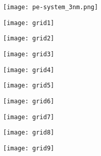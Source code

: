 \begin{figure}[!ht] 
	\centering
	\begin{subfigure}{\textwidth} \centering \texttt{[image: pe-system\_3nm.png]}
	\end{subfigure}%
	\vfill
	\begin{subfigure}{0.33\textwidth} \texttt{[image: grid1]} \end{subfigure}%
	\begin{subfigure}{0.33\textwidth} \texttt{[image: grid2]} \end{subfigure}%
	\begin{subfigure}{0.33\textwidth} \texttt{[image: grid3]} \end{subfigure}%
	\vfill
	\begin{subfigure}{0.33\textwidth} \texttt{[image: grid4]} \end{subfigure}%
	\begin{subfigure}{0.33\textwidth} \texttt{[image: grid5]} \end{subfigure}%
	\begin{subfigure}{0.33\textwidth} \texttt{[image: grid6]} \end{subfigure}%
	\vfill
	\begin{subfigure}{0.33\textwidth} \texttt{[image: grid7]} \end{subfigure}%
	\begin{subfigure}{0.33\textwidth} \texttt{[image: grid8]} \end{subfigure}%
	\begin{subfigure}{0.33\textwidth} \texttt{[image: grid9]} \end{subfigure}%
	\label{f:randalgo}
\end{figure}


